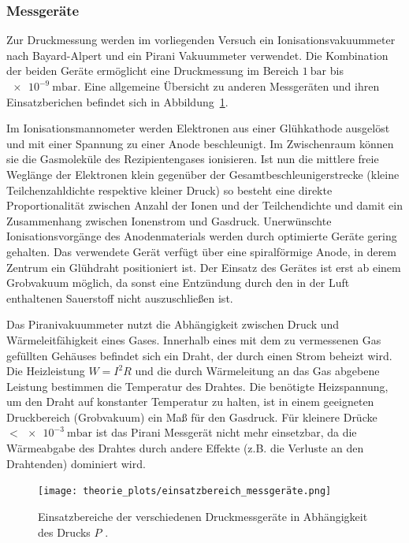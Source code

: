 \subsubsection{Messgeräte}
Zur Druckmessung werden im vorliegenden Versuch ein Ionisationsvakuummeter nach Bayard-Alpert und ein Pirani Vakuummeter verwendet.
Die Kombination der beiden Geräte ermöglicht eine Druckmessung im Bereich $\SI{1}{\bar}$ bis $\SI{e-9}{\milli\bar}$.
Eine allgemeine Übersicht zu anderen Messgeräten und ihren Einsatzberichen befindet sich in Abbildung~\ref{fig: messgeräte}.

Im Ionisationsmannometer werden Elektronen aus einer Glühkathode ausgelöst und mit einer Spannung zu einer Anode beschleunigt.
Im Zwischenraum können sie die
Gasmoleküle des Rezipientengases ionisieren. Ist nun die mittlere freie Weglänge der Elektronen klein gegenüber der
Gesamtbeschleunigerstrecke (kleine Teilchenzahldichte respektive kleiner Druck) so besteht eine direkte Proportionalität
zwischen Anzahl der Ionen und der Teilchendichte und damit ein Zusammenhang zwischen Ionenstrom und Gasdruck. Unerwünschte
Ionisationsvorgänge des Anodenmaterials werden durch optimierte Geräte gering gehalten. Das verwendete Gerät verfügt über
eine spiralförmige Anode, in derem Zentrum ein Glühdraht positioniert ist. Der Einsatz des Gerätes ist erst ab einem
Grobvakuum möglich, da sonst eine Entzündung durch den in der Luft enthaltenen Sauerstoff nicht auszuschließen ist.

Das Piranivakuummeter nutzt die Abhängigkeit zwischen Druck und Wärmeleitfähigkeit eines Gases. Innerhalb eines mit dem
zu vermessenen Gas gefüllten Gehäuses befindet sich ein Draht, der durch einen Strom beheizt wird. Die Heizleistung
$W = I^2 R$ und die durch Wärmeleitung an das Gas abgebene Leistung bestimmen die Temperatur des Drahtes. Die benötigte
Heizspannung, um den Draht auf konstanter Temperatur zu halten, ist in einem geeigneten Druckbereich (Grobvakuum)
ein Maß für den Gasdruck. Für kleinere Drücke $<\SI{e-3}{\milli\bar}$ ist das Pirani Messgerät nicht mehr einsetzbar, da die
Wärmeabgabe des Drahtes durch andere Effekte (z.B. die Verluste an den Drahtenden) dominiert wird.

\begin{figure}
  \centering
  \texttt{[image: theorie\_plots/einsatzbereich\_messgeräte.png]}
  \caption{Einsatzbereiche der verschiedenen Druckmessgeräte in Abhängigkeit des Drucks $P$ \cite{dem1}.}
  \label{fig: messgeräte}
\end{figure}
\FloatBarrier
